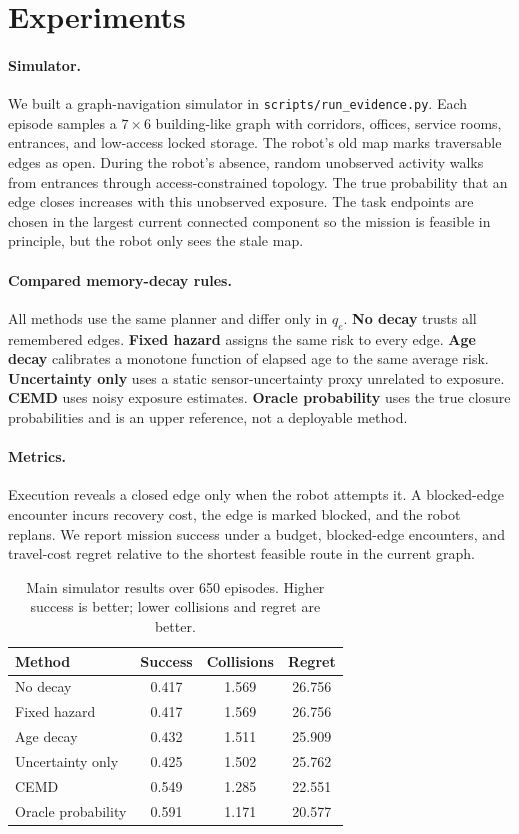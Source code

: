 \documentclass{article}
\begin{document}
\section{Experiments}

\paragraph{Simulator.}
We built a graph-navigation simulator in \texttt{scripts/run\_evidence.py}. Each episode samples a $7 \times 6$ building-like graph with corridors, offices, service rooms, entrances, and low-access locked storage. The robot's old map marks traversable edges as open. During the robot's absence, random unobserved activity walks from entrances through access-constrained topology. The true probability that an edge closes increases with this unobserved exposure. The task endpoints are chosen in the largest current connected component so the mission is feasible in principle, but the robot only sees the stale map.

\paragraph{Compared memory-decay rules.}
All methods use the same planner and differ only in $q_e$. \textbf{No decay} trusts all remembered edges. \textbf{Fixed hazard} assigns the same risk to every edge. \textbf{Age decay} calibrates a monotone function of elapsed age to the same average risk. \textbf{Uncertainty only} uses a static sensor-uncertainty proxy unrelated to exposure. \textbf{CEMD} uses noisy exposure estimates. \textbf{Oracle probability} uses the true closure probabilities and is an upper reference, not a deployable method.

\paragraph{Metrics.}
Execution reveals a closed edge only when the robot attempts it. A blocked-edge encounter incurs recovery cost, the edge is marked blocked, and the robot replans. We report mission success under a budget, blocked-edge encounters, and travel-cost regret relative to the shortest feasible route in the current graph.

\begin{table}[t]
\centering
\caption{Main simulator results over 650 episodes. Higher success is better; lower collisions and regret are better.}
\label{tab:main}
\begin{tabular}{lccc}
\toprule
Method & Success & Collisions & Regret \\
\midrule
No decay & 0.417 & 1.569 & 26.756 \\
Fixed hazard & 0.417 & 1.569 & 26.756 \\
Age decay & 0.432 & 1.511 & 25.909 \\
Uncertainty only & 0.425 & 1.502 & 25.762 \\
CEMD & 0.549 & 1.285 & 22.551 \\
Oracle probability & 0.591 & 1.171 & 20.577 \\
\bottomrule
\end{tabular}
\end{table}
\end{document}
